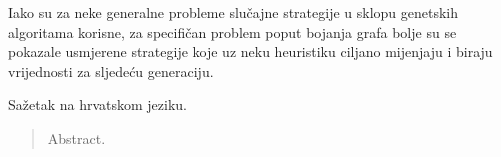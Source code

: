 \documentclass[times, utf8, zavrsni]{fer}
\begin{document}
Iako su za neke generalne probleme slučajne strategije u sklopu genetskih algoritama korisne, za specifičan problem poput bojanja grafa bolje su se pokazale usmjerene strategije koje uz neku heuristiku ciljano mijenjaju i biraju vrijednosti za sljedeću generaciju.




\begin{sazetak}
Sažetak na hrvatskom jeziku.

\end{sazetak}

\begin{abstract}
Abstract.

\end{abstract}
\end{document}
